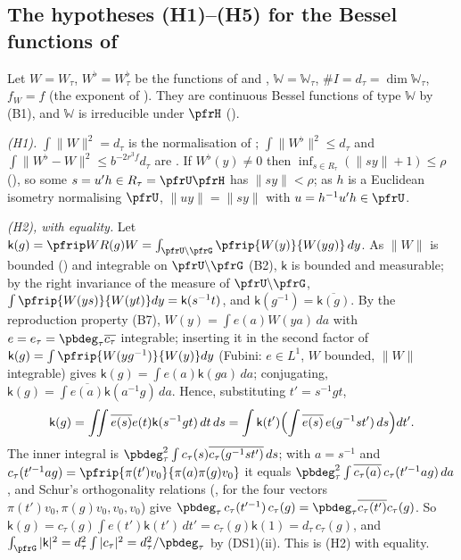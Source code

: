 \documentclass[10pt]{amsart}
\theoremstyle{definition}
\theoremstyle{remark}
\providecommand{\pbW}{\mathbb W}
\begin{document}
\subsection{The hypotheses (H1)--(H5) for the Bessel functions of \texorpdfstring{{\cite[Theorem~3.22]{P51}}}{[Moment, Theorem~3.22]}}\label{prp:ss-H}

Let $W=W_\tau$, $W^\flat=W_\tau^\flat$ be the functions of {\cite[Proposition~3.18]{P51}} and {\cite[Theorem~3.22]{P51}},
$\mathbb W=\pbW_\tau$, $\#I=d_\tau=\dim\pbW_\tau$, $f_W=f$ (the exponent of {\cite[Proposition~3.18(e)]{P51}}). They are
continuous Bessel functions of type $\mathbb W$ by (B1), and $\mathbb W$ is irreducible under $\pfrH$
({\cite[\S3.2.1]{P51}}).

\emph{(H1).} $\int\|W\|^2=d_\tau$ is the normalisation of {\cite[Proposition~3.18]{P51}}; $\int\|W^\flat\|^2\le d_\tau$
and $\int\|W^\flat-W\|^2\le b^{-2r^3f}d_\tau$ are {\cite[Proposition~3.18(e)]{P51}}. If $W^\flat(y)\ne0$ then
$\inf_{s\in R_\tau}(\|sy\|+1)\le\rho$ ({\cite[Proposition~3.18(e)]{P51}}), so some $s=u'h\in R_\tau=\pfrU\pfrH$ has
$\|sy\|<\rho$; as $h$ is a Euclidean isometry normalising $\pfrU$, $\|uy\|=\|sy\|$ with $u=h^{-1}u'h\in\pfrU$.

\emph{(H2), with equality.} Let $\mathsf k(g)=\pfrip W{R(g)W}=\int_{\pfrU\backslash\pfrG}\pfrip{W(y)}{W(yg)}\,dy$. As
$\|W\|$ is bounded ({\cite[Proposition~3.18(a)]{P51}}) and integrable on $\pfrU\backslash\pfrG$ (B2), $\mathsf k$ is
bounded and measurable; by the right invariance of the measure of $\pfrU\backslash\pfrG$,
$\int\pfrip{W(ys)}{W(yt)}dy=\mathsf k(s^{-1}t)$, and $\mathsf k(g^{-1})=\overline{\mathsf k(g)}$. By the reproduction
property (B7), $W(y)=\int e(a)W(ya)\,da$ with $e=e_\tau=\pbdeg_\tau\overline{c_\tau}$ integrable; inserting it in the
second factor of $\mathsf k(g)=\int\pfrip{W(yg^{-1})}{W(y)}dy$ (Fubini: $e\in L^1$, $W$ bounded, $\|W\|$ integrable)
gives $\mathsf k(g)=\int e(a)\mathsf k(ga)\,da$; conjugating, $\mathsf k(g)=\int\overline{e(a)}\mathsf k(a^{-1}g)\,da$.
Hence, substituting $t'=s^{-1}gt$,
\[
\mathsf k(g)=\iint\overline{e(s)}e(t)\mathsf k(s^{-1}gt)\,dt\,ds=\int\mathsf k(t')\Bigl(\int\overline{e(s)}\,e(g^{-1}st')\,ds\Bigr)dt'.
\]
The inner integral is $\pbdeg_\tau^2\int c_\tau(s)\overline{c_\tau(g^{-1}st')}\,ds$; with $a=s^{-1}$ and
$c_\tau(t'^{-1}ag)=\pfrip{\pi(t')v_0}{\pi(a)\pi(g)v_0}$ it equals $\pbdeg_\tau^2\int\overline{c_\tau(a)}\,c_\tau(t'^{-1}ag)\,da$,
and Schur's orthogonality relations ({\cite[\S5.4(ii)]{P51}}, for the four vectors $\pi(t')v_0,\pi(g)v_0,v_0,v_0$)
give $\pbdeg_\tau\,c_\tau(t'^{-1})\,c_\tau(g)=\pbdeg_\tau\overline{c_\tau(t')}c_\tau(g)$. So
$\mathsf k(g)=c_\tau(g)\int e(t')\mathsf k(t')\,dt'=c_\tau(g)\mathsf k(1)=d_\tau\,c_\tau(g)$, and
$\int_\pfrG|\mathsf k|^2=d_\tau^2\int|c_\tau|^2=d_\tau^2/\pbdeg_\tau$ by \textup{(DS1)(ii)}. This is (H2) with equality.
\end{document}
